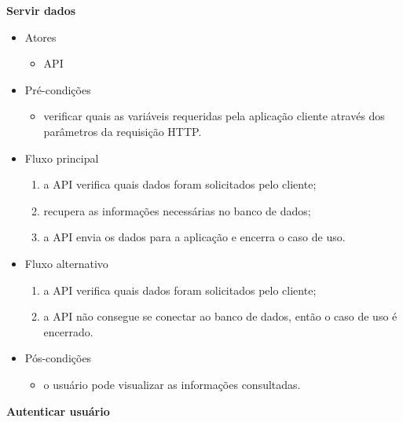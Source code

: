 \textbf{Servir dados}

\begin{itemize}
    \item Atores
    \begin{itemize}
        \item API
    \end{itemize}

    \item Pré-condições
    \begin{itemize}
        \item verificar quais as variáveis requeridas pela aplicação cliente através dos parâmetros da requisição HTTP.
    \end{itemize}

    \item Fluxo principal
    \begin{enumerate}
        \item a API verifica quais dados foram solicitados pelo cliente;
        \item recupera as informações necessárias no banco de dados;
        \item a API envia os dados para a aplicação e encerra o caso de uso.
    \end{enumerate}

	\item Fluxo alternativo
    \begin{enumerate}
        \item a API verifica quais dados foram solicitados pelo cliente;
        \item a API não consegue se conectar ao banco de dados, então o caso de uso é encerrado.
    \end{enumerate}
    
    \item Pós-condições
    \begin{itemize}
        \item o usuário pode visualizar as informações consultadas.
    \end{itemize}
\end{itemize}

\textbf{Autenticar usuário}

